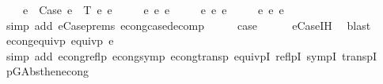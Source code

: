 \begin{isabellebody}
\ \ \ \ e{\isacharprime}{\kern0pt}{\isacharprime}{\kern0pt}\ {\isacharequal}{\kern0pt}\ Case\ e{}{\isacharprime}{\kern0pt}{\isacharprime}{\kern0pt}\ {\isasymGamma}\ T\ e{}{\isacharprime}{\kern0pt}{\isacharprime}{\kern0pt}\ e{}{\isacharprime}{\kern0pt}{\isacharprime}{\kern0pt}\isanewline
\ \ \ \ {\isasymand}\ e{}{\isacharprime}{\kern0pt}\ {\isasymsimeq}e\ e{}{\isacharprime}{\kern0pt}{\isacharprime}{\kern0pt}\isanewline
\ \ \ \ {\isasymand}\ e{}{\isacharprime}{\kern0pt}\ {\isasymsimeq}e\ e{}{\isacharprime}{\kern0pt}{\isacharprime}{\kern0pt}\isanewline
\ \ \ \ {\isasymand}\ e{}{\isacharprime}{\kern0pt}\ {\isasymsimeq}e\ e{}{\isacharprime}{\kern0pt}{\isacharprime}{\kern0pt}{\isachardoublequoteclose}\isanewline
\ \ \ \ \isamarkupfalse%
\ {\isacharparenleft}{\kern0pt}simp\ add{\isacharcolon}{\kern0pt}\ e{\isacharunderscore}{\kern0pt}Case{\isachardot}{\kern0pt}prems\ econg{\isacharunderscore}{\kern0pt}case{\isacharunderscore}{\kern0pt}decomp{}{\isacharparenright}{\kern0pt}\isanewline
\ \ \isamarkupfalse%
\ \isamarkupfalse%
\ {\isacharquery}{\kern0pt}case\isanewline
\ \ \ \ \isamarkupfalse%
\ e{\isacharunderscore}{\kern0pt}Case{\isachardot}{\kern0pt}IH{\isacharparenleft}{\kern0pt}{}{\isacharcomma}{\kern0pt}{}{\isacharcomma}{\kern0pt}{}{\isacharparenright}{\kern0pt}\ \isamarkupfalse%
\ blast\isanewline
{}\isamarkupfalse%
%
\endisatagproof
{\isafoldproof}%
%
\isadelimproof
\isanewline
%
\endisadelimproof
\isanewline
\isanewline
{}\isamarkupfalse%
\ econg{\isacharunderscore}{\kern0pt}equivp{\isacharcolon}{\kern0pt}\ {\isachardoublequoteopen}equivp\ {\isacharparenleft}{\kern0pt}{\isasymsimeq}e{\isacharparenright}{\kern0pt}{\isachardoublequoteclose}\isanewline
%
\isadelimproof
\ \ %
\endisadelimproof
%
\isatagproof
{}\isamarkupfalse%
\ {\isacharparenleft}{\kern0pt}simp\ add{\isacharcolon}{\kern0pt}\ econg{\isacharunderscore}{\kern0pt}reflp\ econg{\isacharunderscore}{\kern0pt}symp\ econg{\isacharunderscore}{\kern0pt}transp\ equivpI\ reflpI\ sympI\ transpI{\isacharparenright}{\kern0pt}%
\endisatagproof
{\isafoldproof}%
%
\isadelimproof
\isanewline
%
\endisadelimproof
\isanewline
\isanewline
{}\isamarkupfalse%
\ p{\isacharunderscore}{\kern0pt}GAbs{\isacharunderscore}{\kern0pt}then{\isacharunderscore}{\kern0pt}econg{\isacharcolon}{\kern0pt}\isanewline

\end{isabellebody}
